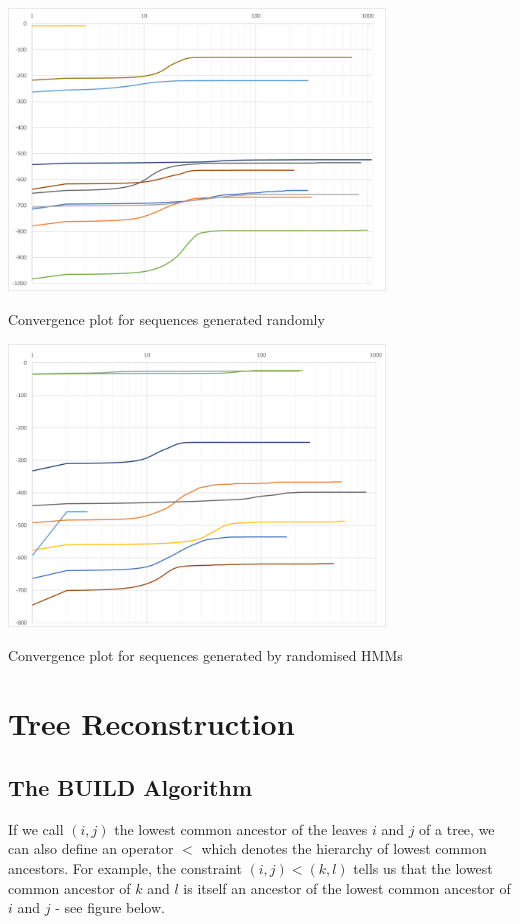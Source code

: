 \documentclass[11pt]{article} %
\begin{document}
\begin{center}
	\includegraphics[width=10cm]{Graph_Random}

	Convergence plot for sequences generated randomly

	\hfill

	\includegraphics[width=10cm]{Graph_HMM}

	Convergence plot for sequences generated by randomised HMMs
\end{center}


\hfill

\hfill


\section{Tree Reconstruction}

\subsection{The BUILD Algorithm}
If we call $(i,j)$ the lowest common ancestor of the leaves $i$ and $j$ of a tree, we can also define an operator $<$ which denotes the hierarchy of lowest common ancestors. For example, the constraint $(i,j)<(k,l)$ tells us that the lowest common ancestor of $k$ and $l$ is itself an ancestor of the lowest common ancestor of $i$ and $j$ - see figure below.
\end{document}
